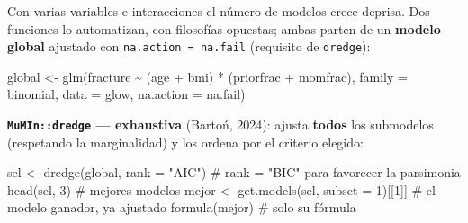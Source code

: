 \documentclass[
  letterpaper,
  DIV=11,
  numbers=noendperiod]{scrartcl}
\newenvironment{Shaded}{\begin{snugshade}}{\end{snugshade}}
\newcommand{\AttributeTok}[1]{\textcolor[rgb]{0.40,0.45,0.13}{#1}}
\newcommand{\CommentTok}[1]{\textcolor[rgb]{0.37,0.37,0.37}{#1}}
\newcommand{\DecValTok}[1]{\textcolor[rgb]{0.68,0.00,0.00}{#1}}
\newcommand{\FunctionTok}[1]{\textcolor[rgb]{0.28,0.35,0.67}{#1}}
\newcommand{\NormalTok}[1]{\textcolor[rgb]{0.00,0.23,0.31}{#1}}
\newcommand{\OtherTok}[1]{\textcolor[rgb]{0.00,0.23,0.31}{#1}}
\newcommand{\SpecialCharTok}[1]{\textcolor[rgb]{0.37,0.37,0.37}{#1}}
\newcommand{\StringTok}[1]{\textcolor[rgb]{0.13,0.47,0.30}{#1}}
\begin{document}
\begin{tcolorbox}[enhanced jigsaw, coltitle=black, rightrule=.15mm, arc=.35mm, leftrule=.75mm, colback=white, colbacktitle=quarto-callout-tip-color!10!white, left=2mm, breakable, toptitle=1mm, toprule=.15mm, bottomtitle=1mm, titlerule=0mm, title=\textcolor{quarto-callout-tip-color}{\faLightbulb}\hspace{0.5em}{🔧 En R. Automatizar la escalera: \texttt{dredge} (exhaustiva) y
\texttt{stepAIC} (paso a paso)}, bottomrule=.15mm, opacityback=0, opacitybacktitle=0.6, colframe=quarto-callout-tip-color-frame]

Con varias variables e interacciones el número de modelos crece deprisa.
Dos funciones lo automatizan, con filosofías opuestas; ambas parten de
un \textbf{modelo global} ajustado con \texttt{na.action\ =\ na.fail}
(requisito de \texttt{dredge}):

\begin{Shaded}
\begin{Highlighting}[]
\NormalTok{global }\OtherTok{\textless{}{-}} \FunctionTok{glm}\NormalTok{(fracture }\SpecialCharTok{\textasciitilde{}}\NormalTok{ (age }\SpecialCharTok{+}\NormalTok{ bmi) }\SpecialCharTok{*}\NormalTok{ (priorfrac }\SpecialCharTok{+}\NormalTok{ momfrac),}
              \AttributeTok{family =}\NormalTok{ binomial, }\AttributeTok{data =}\NormalTok{ glow, }\AttributeTok{na.action =}\NormalTok{ na.fail)}
\end{Highlighting}
\end{Shaded}

\textbf{\texttt{MuMIn::dredge} --- exhaustiva} (Bartoń, 2024): ajusta
\textbf{todos} los submodelos (respetando la marginalidad) y los ordena
por el criterio elegido:

\begin{Shaded}
\begin{Highlighting}[]
\NormalTok{sel   }\OtherTok{\textless{}{-}} \FunctionTok{dredge}\NormalTok{(global, }\AttributeTok{rank =} \StringTok{"AIC"}\NormalTok{)        }\CommentTok{\# rank = "BIC" para favorecer la parsimonia}
\FunctionTok{head}\NormalTok{(sel, }\DecValTok{3}\NormalTok{)                                 }\CommentTok{\# mejores modelos}
\NormalTok{mejor }\OtherTok{\textless{}{-}} \FunctionTok{get.models}\NormalTok{(sel, }\AttributeTok{subset =} \DecValTok{1}\NormalTok{)[[}\DecValTok{1}\NormalTok{]]    }\CommentTok{\# el modelo ganador, ya ajustado}
\FunctionTok{formula}\NormalTok{(mejor)                               }\CommentTok{\# solo su fórmula}
\end{Highlighting}
\end{Shaded}


\end{tcolorbox}
\end{document}
